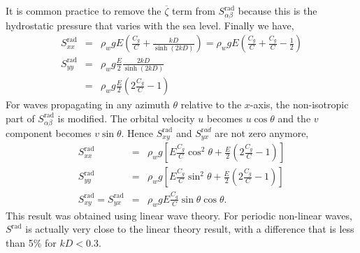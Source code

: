 It is common practice to remove the $\overline{\zeta}$ term from  $S^{\mathrm{rad}}_{\alpha \beta}$ because 
this is the hydrostatic pressure that varies with the sea level. Finally we have, 
\begin{eqnarray}
S^{\mathrm{rad}}_{xx} & = & \rho_w g E\left(\frac{C_g}{C} +  \frac{kD}{\sinh\left(2kD\right)}\right) 
   = \rho_w g E\left(\frac{C_g}{C} + \frac{C_g}{C}-  \frac{1}{2}\right) \label{eq:Sxx} \\
 S^{\mathrm{rad}}_{yy} & = &\rho_w g  \frac{E}{2} \frac{2kD}{\sinh\left(2kD\right)}\\
    & = &  \rho_w g \frac{E}{2}\left(2\frac{C_g}{C}-1\right)
\end{eqnarray}
For waves propagating in any azimuth $\theta$ relative to the $x$-axis, the non-isotropic part of
 $S^{\mathrm{rad}}_{\alpha \beta}$ is modified. The orbital velocity $u$ becomes $u \cos \theta$ 
and the  $v$ component becomes $v \sin \theta$. Hence $S^{\mathrm{rad}}_{xy}$ and $S^{\mathrm
rad}_{yx}$ are not zero anymore, 
\begin{eqnarray}
S^{\mathrm{rad}}_{xx} & = & \rho_w g \left[ E \frac{C_g}{C} \cos^2 \theta
    +   \frac{E}{2}\left(2\frac{C_g}{C}-1\right)\right]\\
 S^{\mathrm{rad}}_{yy} & = &  \rho_w g \left[ E \frac{C_g}{C} \sin^2 \theta
        +  \frac{E}{2}\left(2\frac{C_g}{C}-1\right)\right]\\
 S^{\mathrm{rad}}_{xy}=S^{\mathrm{rad}}_{yx} & = &  \rho_w g E \frac{C_g}{C} \sin \theta \cos \theta.
\end{eqnarray}
This result was obtained using linear wave theory. For periodic non-linear waves, $S^{\mathrm{rad}}$ is actually very close to the linear theory result, 
with a difference that is less than  5\% for $kD < 0.3$. 

